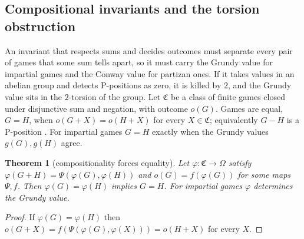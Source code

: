 \documentclass[11pt]{amsart}
\theoremstyle{plain}
\newtheorem{theorem}{Theorem}[section]
\theoremstyle{definition}
\theoremstyle{remark}
\numberwithin{equation}{section}
\begin{document}
\subsection{Compositional invariants and the torsion obstruction}\label{ssec:torsion}
An invariant that respects sums and decides outcomes must separate every pair of games that some sum tells apart, so it must carry the Grundy value for impartial games and the Conway value for partizan ones. If it takes values in an abelian group and detects P-positions as zero, it is killed by $2$, and the Grundy value sits in the $2$-torsion of the group. Let $\mathfrak C$ be a class of finite games closed under disjunctive sum and negation, with outcome $o(G)$. Games are equal, $G=H$, when $o(G+X)=o(H+X)$ for every $X\in\mathfrak C$; equivalently $G-H$ is a P-position \cite{Siegel}. For impartial games $G=H$ exactly when the Grundy values $g(G),g(H)$ agree.

\begin{theorem}[compositionality forces equality]\label{thm:compositional}
Let $\varphi\colon\mathfrak C\to\Omega$ satisfy $\varphi(G+H)=\Psi(\varphi(G),\varphi(H))$ and $o(G)=f(\varphi(G))$ for some maps $\Psi,f$. Then $\varphi(G)=\varphi(H)$ implies $G=H$. For impartial games $\varphi$ determines the Grundy value.
\end{theorem}
\begin{proof}
If $\varphi(G)=\varphi(H)$ then $o(G+X)=f(\Psi(\varphi(G),\varphi(X)))=o(H+X)$ for every $X$.
\end{proof}
\end{document}
